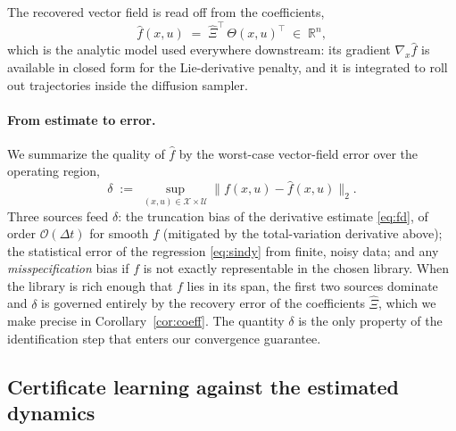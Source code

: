 \documentclass{article}
\newcommand{\R}{\mathbb{R}}
\newcommand{\hf}{\hat{f}}
\newcommand{\Dict}{\Theta}
\begin{document}
The recovered vector field is read off from the coefficients,
\begin{equation}
\label{eq:fhat}
    \hf(x,u)\;=\;\hat\Xi^\top\,\Dict(x,u)^\top \;\in\;\R^n,
\end{equation}
which is the analytic model used everywhere downstream: its gradient
$\nabla_x\hf$ is available in closed form for the Lie-derivative penalty, and it is
integrated to roll out trajectories inside the diffusion sampler.

\paragraph{From estimate to error.}
We summarize the quality of $\hf$ by the worst-case vector-field error over the
operating region,
\begin{equation}
\label{eq:delta}
    \delta \;:=\; \sup_{(x,u)\in\mathcal{X}\times\mathcal{U}} \bigl\|f(x,u)-\hf(x,u)\bigr\|_2.
\end{equation}
Three sources feed $\delta$: the truncation bias of the derivative estimate
\eqref{eq:fd}, of order $\mathcal{O}(\Delta t)$ for smooth $f$ (mitigated by the
total-variation derivative above); the statistical error of the regression
\eqref{eq:sindy} from finite, noisy data; and any \emph{misspecification} bias if
$f$ is not exactly representable in the chosen library. When the library is rich
enough that $f$ lies in its span, the first two sources dominate and $\delta$ is
governed entirely by the recovery error of the coefficients $\hat\Xi$, which we
make precise in Corollary~\ref{cor:coeff}. The quantity $\delta$ is the only
property of the identification step that enters our convergence guarantee.

\subsection{Certificate learning against the estimated dynamics}
\end{document}
